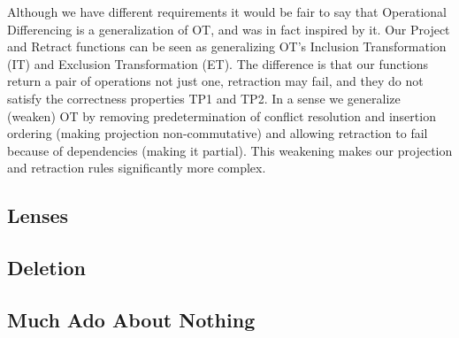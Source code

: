 \documentclass[english,submission]{programming}
\theoremstyle{definition}
\begin{document}
Although we have different requirements it would be fair to say that Operational Differencing is a generalization of OT, and was in fact inspired by it. Our Project and Retract functions can be seen as generalizing OT's Inclusion Transformation (IT) and Exclusion Transformation (ET). The difference is that our functions return a pair of operations not just one, retraction may fail, and they do not satisfy the correctness properties TP1 and TP2. In a sense we generalize (weaken) OT by removing predetermination of conflict resolution and insertion ordering (making projection non-commutative) and allowing retraction to fail because of dependencies (making it partial). This weakening makes our projection and retraction rules significantly more complex.


\subsection{Lenses}

\subsection{Deletion}\label{deletion}




\subsection{Much Ado About Nothing}
\end{document}
